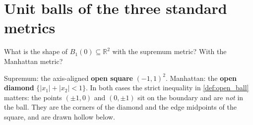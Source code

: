 \section{Unit balls of the three standard metrics}
\label{sec:unit_balls}

\begin{warmup}
What is the shape of $B_1(0) \subseteq \mathbb{R}^2$ with the supremum metric? With the Manhattan
metric?
\end{warmup}

\begin{answer}
Supremum: the axis-aligned \textbf{open square} $(-1,1)^2$. Manhattan: the \textbf{open diamond}
$\{|x_1|+|x_2| < 1\}$. In both cases the strict inequality in \cref{def:open_ball} matters: the
points $(\pm 1,0)$ and $(0,\pm 1)$ sit on the boundary and are \emph{not} in the ball. They are
the corners of the diamond and the edge midpoints of the square, and are drawn hollow below.
\end{answer}


